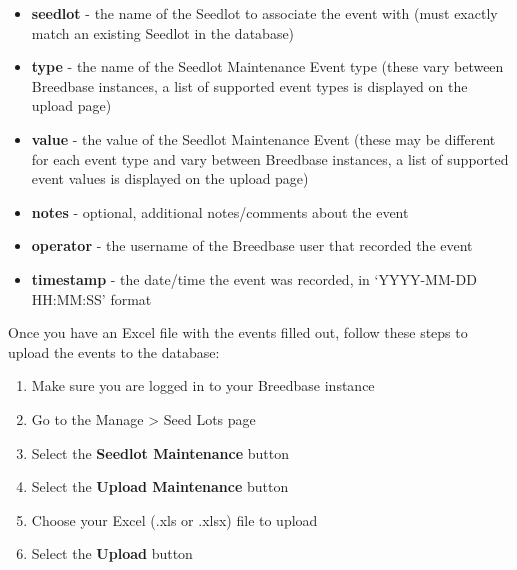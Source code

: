 \documentclass[
  12pt,
]{book}
\providecommand{\tightlist}{%
  \setlength{\itemsep}{0pt}\setlength{\parskip}{0pt}}
\begin{document}
\begin{itemize}
\tightlist
\item
  \textbf{seedlot} - the name of the Seedlot to associate the event with (must exactly match an existing Seedlot in the database)
\item
  \textbf{type} - the name of the Seedlot Maintenance Event type (these vary between Breedbase instances, a list of supported event types is displayed on the upload page)
\item
  \textbf{value} - the value of the Seedlot Maintenance Event (these may be different for each event type and vary between Breedbase instances, a list of supported event values is displayed on the upload page)
\item
  \textbf{notes} - optional, additional notes/comments about the event
\item
  \textbf{operator} - the username of the Breedbase user that recorded the event
\item
  \textbf{timestamp} - the date/time the event was recorded, in `YYYY-MM-DD HH:MM:SS' format
\end{itemize}

Once you have an Excel file with the events filled out, follow these steps to upload the events to the database:

\begin{enumerate}
\def\labelenumi{\arabic{enumi}.}
\tightlist
\item
  Make sure you are logged in to your Breedbase instance
\item
  Go to the Manage \textgreater{} Seed Lots page
\item
  Select the \textbf{Seedlot Maintenance} button
\item
  Select the \textbf{Upload Maintenance} button
\item
  Choose your Excel (.xls or .xlsx) file to upload
\item
  Select the \textbf{Upload} button
\end{enumerate}
\end{document}

